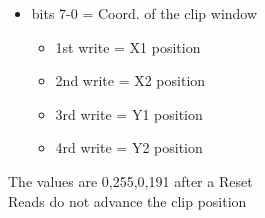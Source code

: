 \begin{itemize}
\item bits 7-0 = Coord. of the clip window
  \begin{itemize}
  \item[] 1st write = X1 position
  \item[] 2nd write = X2 position
  \item[] 3rd write = Y1 position
  \item[] 4rd write = Y2 position
  \end{itemize}
\end{itemize}
The values are 0,255,0,191 after a Reset\\
Reads do not advance the clip position

